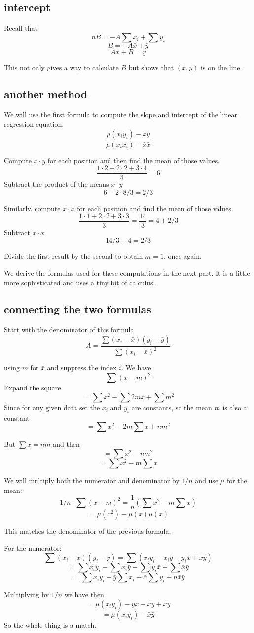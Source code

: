 \documentclass[11pt, oneside]{article}
\begin{document}
\subsection*{intercept}

Recall that 
\[ nB = - A \sum x_i +  \sum y_i \]
\[ B = - A \bar{x} + \bar{y} \]
\[ A \bar{x} + B = \bar{y} \]

This not only gives a way to calculate $B$ but shows that $(\bar{x}, \bar{y})$ is on the line.

\subsection*{another method}
We will use the first formula to compute the slope and intercept of the linear regression equation.  
\[ \frac{\mu (x_i y_i) - \bar{x} \bar{y}}{\mu (x_i x_i) - \bar{x} \bar{x}} \]

Compute $x \cdot y$ for each position and then find the mean of those values.
\[ \frac{1 \cdot 2 + 2 \cdot 2 + 3 \cdot 4}{3} = 6 \]
Subtract the product of the means $\bar{x} \cdot \bar{y}$ 
\[ 6 - 2 \cdot 8/3 = 2/3 \]

Similarly, compute $x \cdot x$ for each position and find the mean of those values.
\[ \frac{1 \cdot 1 + 2 \cdot 2 + 3 \cdot 3}{3} = \frac{14}{3} = 4 + 2/3 \]
Subtract $\bar{x} \cdot \bar{x}$
\[ 14/3 - 4 = 2/3 \]

Divide the first result by the second to obtain $m = 1$, once again.

We derive the formulas used for these computations in the next part.  It is a little more sophisticated and uses a tiny bit of calculus.

\subsection*{connecting the two formulas}

Start with the denominator of this formula
\[ A = \frac{\sum (x_i - \bar{x})(y_i - \bar{y})}{\sum (x_i -\bar{x})^2 } \]

using $m$ for $\bar{x}$ and suppress the index $i$.  We have
\[ \sum (x - m)^2 \]
Expand the square
\[ = \sum x^2 - \sum 2mx + \sum m^2 \]
Since for any given data set the $x_i$ and $y_i$ are constants, so the mean $m$ is also a constant
\[ = \sum x^2 - 2m \sum x + nm^2 \]

But $\sum x = nm$ and then
\[ = \sum x^2 - nm^2 \]
\[ = \sum x^2 - m \sum x \]

We will multiply both the numerator and denominator by $1/n$ and use $\mu$ for the mean:
\[ 1/n \cdot  \sum (x - m)^2 = \frac{1}{n} ( \sum x^2 - m \sum x) \]
\[ = \mu(x^2) - \mu(x) \mu(x) \]

This matches the denominator of the previous formula.  

For the numerator:
\[ \sum (x_i - \bar{x})(y_i - \bar{y}) = \sum (x_i y_i - x_i \bar{y} - y_i \bar{x} + \bar{x} \bar{y} ) \]
\[ = \sum x_i y_i - \sum x_i \bar{y} - \sum y_i \bar{x} + \sum \bar{x} \bar{y} \]
\[ = \sum x_i y_i - \bar{y} \sum x_i - \bar{x} \sum y_i  + n \bar{x} \bar{y} \]

Multiplying by $1/n$ we have then
\[ = \mu(x_i y_i) - \bar{y} \bar{x} - \bar{x} \bar{y} + \bar{x} \bar{y} \]
\[ = \mu(x_i y_i) - \bar{x} \bar{y} \]
So the whole thing is a match.
\end{document}
